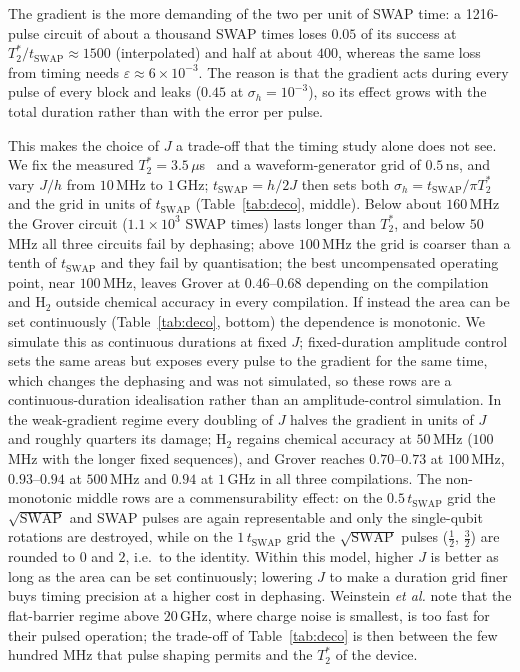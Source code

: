 \documentclass[reprint,aps,pra,amsmath,amssymb,superscriptaddress,letterpaper]{revtex4-2}
\newcommand{\Hz}{\mathrm{H}_2}
\newcommand{\tsw}{t_{\mathrm{SWAP}}}
\begin{document}
The gradient is the more demanding of the two per unit of SWAP time: a 1216-pulse circuit of about a thousand SWAP times loses $0.05$ of its success at $T_2^*/\tsw\approx1500$ (interpolated) and half at about $400$, whereas the same loss from timing needs $\varepsilon\approx6\times10^{-3}$. The reason is that the
gradient acts during every pulse of every block and leaks ($0.45$ at $\sigma_h=10^{-3}$), so its effect grows with the total duration rather than
with the error per pulse.

This makes the choice of $J$ a trade-off that the timing study alone does not
see. We fix the measured $T_2^*=3.5\,\mu$s~\cite{weinstein2023} and a
waveform-generator grid of $0.5$\,ns, and vary $J/h$ from $10$\,MHz to $1$\,GHz;
$\tsw=h/2J$ then sets both $\sigma_h=\tsw/\pi T_2^*$ and the grid in units of
$\tsw$ (Table~\ref{tab:deco}, middle). Below about $160$\,MHz the Grover circuit ($1.1\times10^3$ SWAP times) lasts longer than $T_2^*$, and below $50$\,MHz all three circuits fail by dephasing; above $100$\,MHz the grid is coarser than a tenth of $\tsw$ and they fail by quantisation; the best uncompensated operating point, near $100$\,MHz, leaves Grover at $0.46$--$0.68$ depending on the compilation and $\Hz$ outside chemical accuracy in every compilation. If instead the area can be set continuously (Table~\ref{tab:deco}, bottom) the dependence is monotonic. We simulate this as continuous durations at fixed $J$; fixed-duration amplitude control sets the same areas but exposes every pulse to the gradient for the same time, which changes the dephasing and was not simulated, so these rows are a continuous-duration idealisation rather than an amplitude-control simulation. In the weak-gradient regime every doubling of $J$ halves the gradient in units of $J$ and roughly quarters its damage; $\Hz$ regains chemical accuracy at $50$\,MHz ($100$\,MHz with the longer fixed sequences), and Grover reaches $0.70$--$0.73$ at $100$\,MHz, $0.93$--$0.94$ at $500$\,MHz and $0.94$ at $1$\,GHz in all three compilations. The non-monotonic middle rows are a commensurability effect: on the $0.5\,\tsw$ grid the $\sqrt{\mathrm{SWAP}}$ and SWAP pulses are again representable and only the single-qubit rotations are destroyed, while on the $1\,\tsw$ grid the $\sqrt{\mathrm{SWAP}}$ pulses ($\tfrac12$, $\tfrac32$) are rounded to $0$ and $2$, i.e.\ to the identity. Within this model, higher $J$ is better as long as the area can be set continuously; lowering $J$ to make a duration grid finer buys timing precision at a higher cost in dephasing. Weinstein \emph{et al.} note that the flat-barrier regime above $20$\,GHz, where charge noise is smallest, is too fast for their pulsed operation; the trade-off of Table~\ref{tab:deco} is then between the few hundred MHz that pulse shaping permits and the $T_2^*$ of the device.
\end{document}
